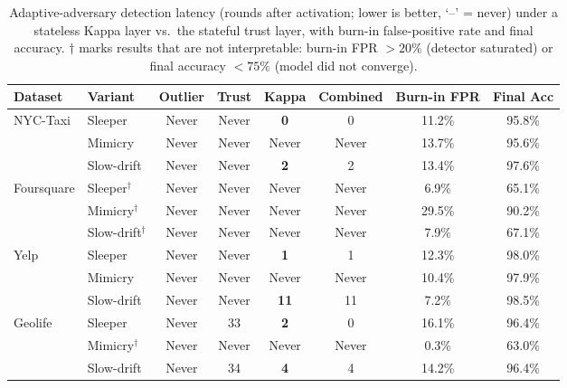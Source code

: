 \begin{table}[t]\centering\small
\caption{Adaptive-adversary detection latency (rounds after activation; lower is better, `--' = never) under a stateless Kappa layer vs.\ the stateful trust layer, with burn-in false-positive rate and final accuracy. $\dagger$ marks results that are not interpretable: burn-in FPR $>20\%$ (detector saturated) or final accuracy $<75\%$ (model did not converge).}
\label{tab:adaptive}
\begin{tabular}{llcccccc}
\toprule
Dataset & Variant & Outlier & Trust & \textbf{Kappa} & Combined & Burn-in FPR & Final Acc \\
\midrule
NYC-Taxi & Sleeper & Never & Never & \textbf{0} & 0 & 11.2\% & 95.8\% \\
 & Mimicry & Never & Never & Never & Never & 13.7\% & 95.6\% \\
 & Slow-drift & Never & Never & \textbf{2} & 2 & 13.4\% & 97.6\% \\
\midrule
Foursquare & Sleeper$^\dagger$ & Never & Never & Never & Never & 6.9\% & 65.1\% \\
 & Mimicry$^\dagger$ & Never & Never & Never & Never & 29.5\% & 90.2\% \\
 & Slow-drift$^\dagger$ & Never & Never & Never & Never & 7.9\% & 67.1\% \\
\midrule
Yelp & Sleeper & Never & Never & \textbf{1} & 1 & 12.3\% & 98.0\% \\
 & Mimicry & Never & Never & Never & Never & 10.4\% & 97.9\% \\
 & Slow-drift & Never & Never & \textbf{11} & 11 & 7.2\% & 98.5\% \\
\midrule
Geolife & Sleeper & Never & 33 & \textbf{2} & 0 & 16.1\% & 96.4\% \\
 & Mimicry$^\dagger$ & Never & Never & Never & Never & 0.3\% & 63.0\% \\
 & Slow-drift & Never & 34 & \textbf{4} & 4 & 14.2\% & 96.4\% \\
\bottomrule
\end{tabular}
\end{table}
